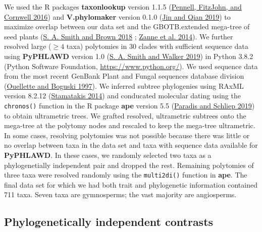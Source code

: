 \documentclass[
  10pt,
]{article}
\begin{document}
We used the R packages \textbf{taxonlookup} version 1.1.5 (\protect\hyperlink{ref-pennell_simple_2016}{Pennell, FitzJohn, and Cornwell 2016}) and \textbf{V.phylomaker} version 0.1.0 (\protect\hyperlink{ref-jin_vphylomaker_2019}{Jin and Qian 2019}) to maximize overlap between our data set and the GBOTB.extended mega-tree of seed plants (\protect\hyperlink{ref-smith_constructing_2018}{S. A. Smith and Brown 2018} ; \protect\hyperlink{ref-zanne_three_2014}{Zanne et al. 2014}). We further resolved large (\(\ge4\) taxa) polytomies in 30 clades with sufficient sequence data using \textbf{PyPHLAWD} version 1.0 (\protect\hyperlink{ref-smith_pyphlawd_2019}{S. A. Smith and Walker 2019}) in Python 3.8.2 (Python Software Foundation, \url{https://www.python.org/}). We used sequence data from the most recent GenBank Plant and Fungal sequences database division (\protect\hyperlink{ref-ouellette_database_1997}{Ouellette and Boguski 1997}). We inferred subtree phylogenies using RAxML version 8.2.12 (\protect\hyperlink{ref-stamatakis_raxml_2014}{Stamatakis 2014}) and conducated molecular dating using the \texttt{chronos()} function in the R package \textbf{ape} version 5.5 (\protect\hyperlink{ref-paradis_ape_2019}{Paradis and Schliep 2019}) to obtain ultrametric trees. We grafted resolved, ultrametric subtrees onto the mega-tree at the polytomy nodes and rescaled to keep the mega-tree ultrametric. In some cases, resolving polytomies was not possible because there was little or no overlap between taxa in the data set and taxa with sequence data available for \textbf{PyPHLAWD}. In these cases, we randomly selected two taxa as a phylogenetially independent pair and dropped the rest. Remaining polytomies of three taxa were resolved randomly using the \texttt{multi2di()} function in \textbf{ape}. The final data set for which we had both trait and phylogenetic information contained 711 taxa. Seven taxa are gymnosperms; the vast majority are angiosperms.

\hypertarget{phylogenetically-independent-contrasts}{%
\subsection{Phylogenetically independent contrasts}\label{phylogenetically-independent-contrasts}}
\end{document}
